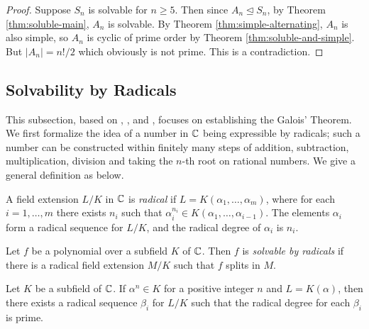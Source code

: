 \begin{proof}
	Suppose $S_n$ is solvable for $n \ge 5$. Then since $A_n \trianglelefteq S_n$, by Theorem \ref{thm:soluble-main}, $A_n$ is solvable. By Theorem \ref{thm:simple-alternating}, $A_n$ is also simple, so $A_n$ is cyclic of prime order by Theorem \ref{thm:soluble-and-simple}. But $|A_n| = n! / 2$ which obviously is not prime. This is a contradiction.
\end{proof}








\subsection{Solvability by Radicals}
This subsection, based on \cite[Chapter~15]{Stewart}, \cite[p.~71-75]{  rotman_galois_1998}, \cite[Section~9]{introduction-to-galois-theory} and \cite{cambridge-galois-lecture-polynomials}, focuses on establishing the Galois' Theorem. We first formalize the idea of a number in $\mathbb C$ being expressible by radicals; such a number can be constructed within finitely many steps of addition, subtraction, multiplication, division and taking the $n$-th root on rational numbers. We give a general definition as below. 
\begin{definition} \label{def:radical-extension}
	A field extension $L / K$ in $\mathbb C$ is \textit{radical} if $L=K\left(\alpha_1, \ldots, \alpha_m\right)$, where for each $i=1, \ldots, m$ there exists $n_i$ such that
	$
	\alpha_i^{n_i} \in K\left(\alpha_1, \ldots, \alpha_{i-1}\right).
	$
	The elements $\alpha_i$ form a radical sequence for $L / K$, and the radical degree of $\alpha_i$ is $n_i$.
\end{definition}

\begin{definition}
	Let $f$ be a polynomial over a subfield $K$ of $\mathbb C$. Then $f$ is \textit{solvable by radicals} if there is a radical field extension $M/K$ such that $f$ splits in $M$. 
\end{definition}

\begin{theorem} \label{thm:radical-single-prime}
	Let $K$ be a subfield of $\mathbb C$. If $\alpha ^ n \in K$ for a positive integer $n$ and  $L = K (\alpha)$, then there exists a radical sequence $\beta_i$ for $L / K$ such that the radical degree for each $\beta_i$ is prime.
\end{theorem}

